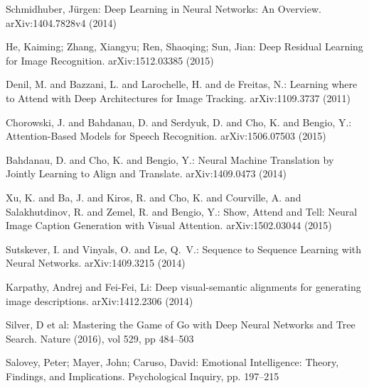 \documentclass[citeauthoryear]{llncs}
\begin{document}
\begin{thebibliography}{}

Schmidhuber, J{\"u}rgen:
Deep Learning in Neural Networks: An Overview.
arXiv:1404.7828v4 (2014)


He, Kaiming; Zhang, Xiangyu; Ren, Shaoqing; Sun, Jian:
Deep Residual Learning for Image Recognition.
arXiv:1512.03385 (2015)


{Denil}, M. and {Bazzani}, L. and {Larochelle}, H. and {de Freitas}, N.:
Learning where to Attend with Deep Architectures for Image Tracking.
arXiv:1109.3737 (2011)

{Chorowski}, J. and {Bahdanau}, D. and {Serdyuk}, D. and {Cho}, K. and {Bengio}, Y.:
Attention-Based Models for Speech Recognition.
arXiv:1506.07503 (2015)


{Bahdanau}, D. and {Cho}, K. and {Bengio}, Y.:
Neural Machine Translation by Jointly Learning to Align and Translate.
arXiv:1409.0473 (2014)



{Xu}, K. and {Ba}, J. and {Kiros}, R. and {Cho}, K. and {Courville}, A. and {Salakhutdinov}, R. and {Zemel}, R. and {Bengio}, Y.:
Show, Attend and Tell: Neural Image Caption Generation with Visual Attention.
arXiv:1502.03044 (2015)


{Sutskever}, I. and {Vinyals}, O. and {Le}, Q.~V.:
Sequence to Sequence Learning with Neural Networks.
arXiv:1409.3215 (2014)

Karpathy, Andrej and Fei-Fei, Li:
Deep visual-semantic alignments for generating image descriptions.
arXiv:1412.2306 (2014)



Silver, D et al:
Mastering the Game of Go with Deep Neural Networks and Tree Search.
Nature (2016), vol 529, pp 484--503


Salovey, Peter; Mayer, John; Caruso, David:
Emotional Intelligence: Theory, Findings, and Implications.
Psychological Inquiry, pp. 197–215


\end{thebibliography}
\end{document}
